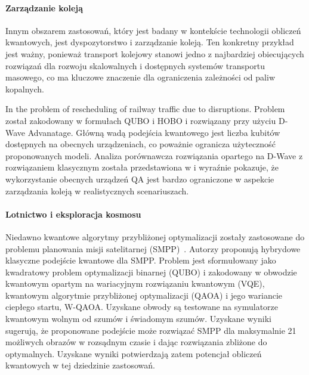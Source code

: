 \documentclass[a4paper,11pt]{article}
\begin{document}
 
\paragraph{Zarządzanie koleją}

Innym obszarem zastosowań, który jest badany w kontekście technologii obliczeń kwantowych, jest dyspozytorstwo i zarządzanie koleją. Ten konkretny przykład jest ważny, ponieważ transport kolejowy stanowi jedno z najbardziej obiecujących rozwiązań dla rozwoju skalowalnych i dostępnych systemów transportu masowego, co ma kluczowe znaczenie dla ograniczenia zależności od paliw kopalnych.


In \cite{domino2022quadratic} the problem of rescheduling of railway traffic due to disruptions. Problem został zakodowany w formułach QUBO i HOBO i rozwiązany przy użyciu D-Wave Advanatage. Główną wadą podejścia kwantowego jest liczba kubitów dostępnych na obecnych urządzeniach, co poważnie ogranicza użyteczność proponowanych modeli. Analiza porównawcza rozwiązania opartego na D-Wave z rozwiązaniem klasycznym została przedstawiona w \cite{domino2023quantum} i wyraźnie pokazuje, że wykorzystanie obecnych urządzeń QA jest bardzo ograniczone w aspekcie zarządzania koleją w realistycznych scenariuszach. 


\paragraph{Lotnictwo i eksploracja kosmosu}

Niedawno kwantowe algorytmy przybliżonej optymalizacji zostały zastosowane do problemu planowania misji satelitarnej (SMPP)~\cite{quetschlich2023satellite}. Autorzy proponują hybrydowe klasyczne podejście kwantowe dla SMPP. Problem jest sformułowany jako kwadratowy problem optymalizacji binarnej (QUBO) i zakodowany w obwodzie kwantowym opartym na wariacyjnym rozwiązaniu kwantowym (VQE), kwantowym algorytmie przybliżonej optymalizacji (QAOA) i jego wariancie ciepłego startu, W-QAOA. Uzyskane obwody są testowane na symulatorze kwantowym wolnym od szumów i świadomym szumów. Uzyskane wyniki sugerują, że proponowane podejście może rozwiązać SMPP dla maksymalnie 21 możliwych obrazów w rozsądnym czasie i dając rozwiązania zbliżone do optymalnych. Uzyskane wyniki potwierdzają zatem potencjał obliczeń kwantowych w tej dziedzinie zastosowań.
\end{document}

